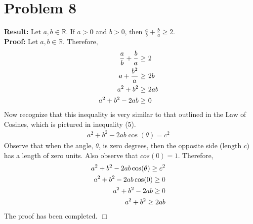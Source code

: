 \documentclass[11pt]{article}
\begin{document}
\newpage



\section*{Problem 8}

    \textbf{Result:} Let $a, b \in \mathbb{R}$. If $a>0$ and $b>0$, then $\frac{a}{b}+\frac{b}{a} \geq 2$.
    \\
    \textbf{Proof:} Let $a, b \in \mathbb{R}$. Therefore, 
    \begin{align}
        \frac{a}{b}+\frac{b}{a} \geq& \ 2 \notag \\
        a+\frac{b^2}{a} \geq& \ 2b \notag \\
        a^2+b^2 \geq& \ 2ab \notag \\
        a^2 + b^2 -2ab \geq& \ 0 \notag
    \end{align}
    Now recognize that this inequality is very similar to that outlined in the Law of Cosines, which is pictured in inequality (5).
    \begin{align}
         a^2 + b^2 -2ab\cos(\theta) = c^2 
    \end{align}
    Observe that when the angle, $\theta$, is zero degrees, then the opposite side (length $c$) has a length of zero units. Also observe that $cos(0) = 1$. Therefore,
    \begin{align}
        a^2 + b^2 -2ab\cos(\theta) \geq c^2 \notag \\
        a^2 + b^2 -2ab\cos(0) \geq 0 \notag \\
        a^2 + b^2 -2ab \geq 0 \notag \\
        a^2 + b^2 \geq 2ab \notag
    \end{align}
    The proof has been completed.
    \hfill $\Box$

\newpage
\end{document}
